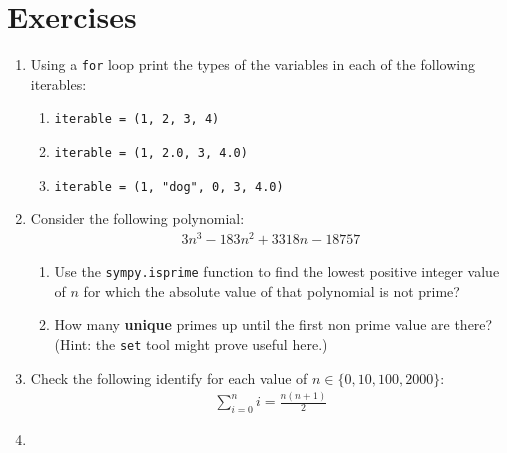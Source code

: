 \section{Exercises}
\begin{enumerate}

\item 

Using a \texttt{for} loop print the types of the variables in each of the following
iterables:
\begin{enumerate}

\item 

\texttt{iterable = (1, 2, 3, 4)}

\item 

\texttt{iterable = (1, 2.0, 3, 4.0)}

\item 

\texttt{iterable = (1, "dog", 0, 3, 4.0)}

\end{enumerate}

\item 

Consider the following polynomial:
\begin{equation*}
\begin{split}
    3 n ^ 3 - 183n ^ 2 + 3318n - 18757
   \end{split}
\end{equation*}\begin{enumerate}

\item 

Use the \texttt{sympy.isprime} function to find the lowest positive integer value
of \(n\) for which the absolute value of that polynomial is not prime?

\item 

How many \textbf{unique} primes up until the first non prime value are there?
(Hint: the \texttt{set} tool might prove useful here.)

\end{enumerate}

\item 

Check the following identify for each value of \(n\in\{0, 10, 100, 2000\}\):
\begin{equation*}
\begin{split}
       \sum_{i=0}^n i=\frac{n(n+1)}{2}
   \end{split}
\end{equation*}
\item 


\end{enumerate}
